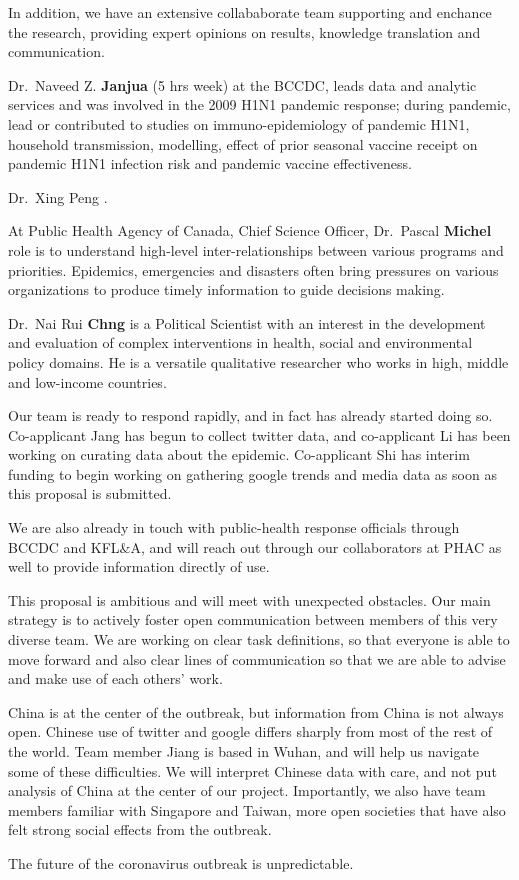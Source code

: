 In addition, we have an extensive collababorate team supporting and enchance the research, providing expert opinions on results, knowledge translation and communication.

Dr.\ Naveed Z. \textbf{Janjua} (5 hrs week) at the BCCDC, leads data and analytic services and was involved in the 2009 H1N1 pandemic response; during pandemic, lead or contributed to studies on  immuno-epidemiology of pandemic H1N1, household transmission, modelling, effect of prior seasonal vaccine receipt on pandemic H1N1 infection risk and pandemic vaccine effectiveness. 

Dr.\ Xing Peng  .

At Public Health Agency of Canada, Chief Science Officer, Dr.\ Pascal \textbf{Michel} role is to understand high-level inter-relationships between various programs and priorities. Epidemics, emergencies and disasters often bring pressures on various organizations to produce timely information to guide decisions making. 

Dr.\ Nai Rui \textbf{Chng} is a Political Scientist with an interest in the development and evaluation of complex interventions in health, social and environmental policy domains. He is a versatile qualitative researcher who works in high, middle and low-income countries.

Our team is ready to respond rapidly, and in fact has already started doing so. Co-applicant Jang has begun to collect twitter data, and co-applicant Li has been working on curating data about the epidemic. Co-applicant Shi has interim funding to begin working on gathering google trends and media data as soon as this proposal is submitted.

We are also already in touch with public-health response officials through BCCDC and KFL\&A, and will reach out through our collaborators at PHAC as well to provide information directly of use.


This proposal is ambitious and will meet with unexpected obstacles. Our main strategy is to actively foster open communication between members of this very diverse team. We are working on clear task definitions, so that everyone is able to move forward and also clear lines of communication so that we are able to advise and make use of each others' work.

China is at the center of the outbreak, but information from China is not always open. Chinese use of twitter and google differs sharply from most of the rest of the world. Team member Jiang is based in Wuhan, and will help us navigate some of these difficulties. We will interpret Chinese data with care, and not put analysis of China at the center of our project. Importantly, we also have team members familiar with Singapore and Taiwan, more open societies that have also felt strong social effects from the outbreak.

The future of the coronavirus outbreak is unpredictable. 

